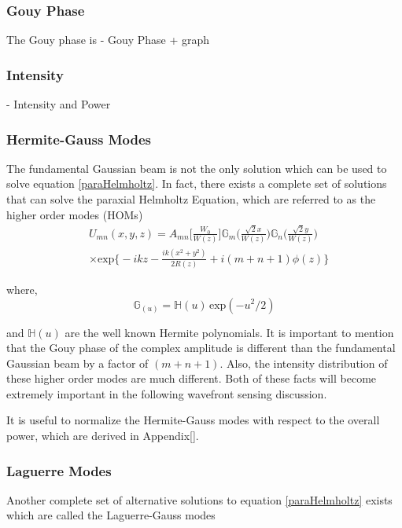 \documentclass[oneside]{book}
\begin{document}
		\subsubsection{Gouy Phase}
		The Gouy phase is 
		- Gouy Phase + graph
		\subsubsection{Intensity}
		- Intensity and Power
		
		\subsubsection{Hermite-Gauss Modes}
		The fundamental Gaussian beam is not the only solution which can be used to solve equation \ref{paraHelmholtz}.  In fact, there exists a complete set of solutions that can solve the paraxial Helmholtz Equation, which are referred to as the higher order modes (HOMs)
		\begin{equation}\label{HG}
		\begin{aligned}
		&U_{mn}(x,y,z) = A_{mn}\bigg[ \frac{W_0}{W(z)} \bigg] \mathbb{G}_m\Bigg( \frac{\sqrt{2}x}{W(z)}  \Bigg) \mathbb{G}_n\Bigg( \frac{\sqrt{2}y}{W(z)} \Bigg)\\
		&\times \text{exp} \bigg\{ -ikz - \frac{ik(x^2+y^2)}{2R(z)} + i(m+n+1)\phi(z) \bigg\}
		\end{aligned}
		\end{equation}
		
		where,
		\begin{equation}
		\mathbb{G}_(u) = \mathbb{H}(u) \, \text{exp}(-u^2/2)
		\end{equation}
		
		and $ \mathbb{H}(u)$ are the well known Hermite polynomials.  It is important to mention that the Gouy phase of the complex amplitude is different than the fundamental Gaussian beam by a factor of $(m + n + 1)$. Also, the intensity distribution of these higher order modes are much different. Both of these facts will become extremely important in the following wavefront sensing discussion.
		
		It is useful to normalize the Hermite-Gauss modes with respect to the overall power, which are derived in Appendix[].
		
		\subsubsection{Laguerre Modes}
		Another complete set of alternative solutions to equation \ref{paraHelmholtz} exists which are called the Laguerre-Gauss modes
		
\end{document}
